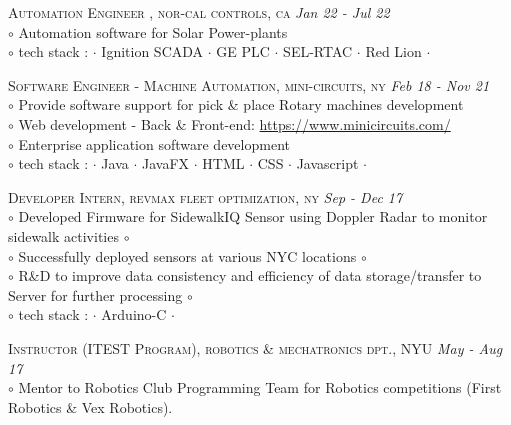\documentclass[a4paper]{article}
\begin{document}
\begin{spacing}{0.1}
\end{spacing}
%
\textsc	{	 	Automation Engineer	, nor-cal controls, ca																					} \hfill \emph {Jan 22 - Jul 22	}	\\
		{	$\circ$	Automation software for Solar Power-plants 																					}	\\
		{	$\circ$	tech stack : $\cdot$ Ignition SCADA $\cdot$ GE PLC $\cdot$ SEL-RTAC $\cdot$ Red Lion $\cdot$													}	\\
%
\begin{spacing}{0.1}
\end{spacing}
\textsc	{		Software Engineer - Machine Automation, mini-circuits, ny																		} \hfill \emph {Feb 18 - Nov 21	}	\\
		{	$\circ$ 	Provide software support for pick \& place Rotary machines development}	\\
		{	$\circ$ 	Web development - Back \& Front-end: \href{https://www.minicircuits.com/}{https://www.minicircuits.com/}}	\\
		{	$\circ$ 	Enterprise application software development}	\\
		{	$\circ$	tech stack : $\cdot$ Java $\cdot$ JavaFX $\cdot$ HTML $\cdot$ CSS $\cdot$ Javascript $\cdot$													}	\\
%
\begin{spacing}{0.1}
\end{spacing}
\textsc	{	 	Developer Intern, revmax fleet optimization, ny																						} \hfill \emph {Sep - Dec 17	}	\\
		{	$\circ$ 	Developed Firmware for SidewalkIQ Sensor using Doppler Radar to monitor sidewalk activities $\circ$													}	\\
		{	$\circ$ 	Successfully deployed sensors at various NYC locations $\circ$																					}	\\
		{	$\circ$ 	R\&D to improve data consistency and efficiency of data storage/transfer to Server for further processing $\circ$												}	\\
		{	$\circ$	tech stack : $\cdot$ Arduino-C $\cdot$ 																										}	\\
%
\begin{spacing}{0.1}
\end{spacing}
\textsc	{		Instructor (ITEST Program), robotics \& mechatronics dpt., NYU																				} \hfill \emph {May - Aug 17	}	\\
		{	$\circ$ 	Mentor to Robotics Club Programming Team for Robotics competitions (First Robotics \& Vex Robotics).												}	\\
\end{document}
